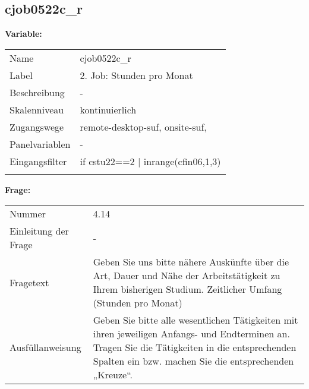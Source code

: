 	
	
	\subsection{cjob0522c\_r}
	\label{subSection:cjob0522c_r}

	\noindent\textbf{Variable:}\\
		\begin{tabular}{lL{11.3cm}}
			\label{tableVariable:cjob0522c_r}
			Name & cjob0522c\_r \\
			Label & 2. Job: Stunden pro Monat \\
			Beschreibung & - \\
			Skalenniveau & kontinuierlich \\
			Zugangswege &
				remote-desktop-suf,
				onsite-suf,
 \\
			Panelvariablen & -
			 \\
			Eingangsfilter & if cstu22==2 | inrange(cfin06,1,3) \\
 \\
		\end{tabular}

		\vspace*{1 cm}
		\noindent\textbf{Frage:}\\
		\begin{tabular}{lL{11.3cm}}
			\label{tableQuestion:cjob0522c_r}
			Nummer & 4.14 \\
			Einleitung der Frage & - \\
			Fragetext & Geben Sie uns bitte nähere Auskünfte über die Art, Dauer und Nähe der Arbeitstätigkeit zu Ihrem bisherigen Studium.
Zeitlicher Umfang
(Stunden pro Monat) \\
			Ausfüllanweisung & Geben Sie bitte alle wesentlichen Tätigkeiten mit ihren jeweiligen Anfangs- und Endterminen an. Tragen Sie die Tätigkeiten in die entsprechenden Spalten ein bzw. machen Sie die entsprechenden „Kreuze“. \\
		\end{tabular}




